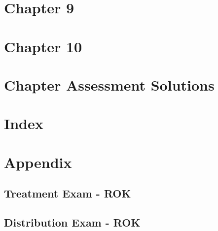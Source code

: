 \documentclass[11pt,fleqn]{book} %
\begin{document}
\part{Chapter 9}


\part{Chapter 10}


\part{Chapter Assessment Solutions}

%


\part{Index}
\printindex

\part{Appendix}

\appendix

\renewcommand{\chaptername}{Appendix A: } %

\vfill

\appendix
{} %


\chapter{Treatment Exam - ROK}\label{appendix:Treatment Exam - ROK}


\chapter{Distribution Exam - ROK}\label{appendix:Distribution Exam - ROK}

\end{document}
